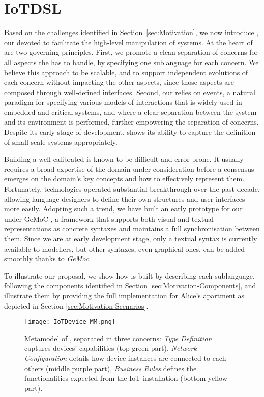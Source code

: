 \section{IoTDSL}
\label{sec:IoTDSL}

Based on the challenges identified in Section~\ref{sec:Motivation}, we now introduce \IOTDSL, our \DSL devoted to facilitate the high-level manipulation of \IOT systems. At the heart of \IOTDSL are two governing principles. First, we promote a clean separation of concerns for all aspects the \DSL has to handle, by specifying one sublanguage for each concern. We believe this approach to be scalable, and to support independent evolutions of each concern without impacting the other aspects, since those aspects are composed through well-defined interfaces. Second, our \DSL relies on events, a natural paradigm for specifying various models of interactions that is widely used in embedded and critical systems, and where a clear separation between the system and its environment is performed, further empowering the separation of concerns. Despite its early stage of development, \IOTDSL shows its ability to capture the definition of small-scale \IOT systems appropriately.

Building a well-calibrated \DSL is known to be difficult and error-prone. It usually requires a broad expertise of the domain under consideration before a consensus emerges on the domain's key concepts and how to effectively represent them. Fortunately, \MDE technologies operated substantial breakthrough over the past decade, allowing language designers to define their own \DSL structures and user interfaces more easily. Adopting such a trend, we have built an early prototype for our \DSL under GeMoC \cite[\url{http://gemoc.org}]{bousse-16}, a \MDE framework that supports both visual and textual representations as concrete syntaxes and maintains a full synchronisation between them. Since we are at early development stage, only a textual syntax is currently available to modellers, but other syntaxes, even graphical ones, can be added smoothly thanks to \textit{GeMoc}.

To illustrate our proposal, we show how \IOTDSL is built by describing each sublanguage, following the \DSL components identified in Section \ref{sec:Motivation-Components}, and illustrate them by providing the full implementation for Alice's apartment as depicted in Section \ref{sec:Motivation-Scenarios}.

\begin{figure*}%
  \centering  
  \texttt{[image: IoTDevice-MM.png]}%
  \caption{Metamodel of \IOTDSL, separated in three concerns: \emph{Type Definition} captures devices' capabilities (top green part), \emph{Network Configuration} details how device instances are connected to each others (middle purple part), \emph{Business Rules} defines the functionalities expected from the IoT installation (bottom yellow part).}%
  \label{fig:IoTDevice-MM}%
\end{figure*}







